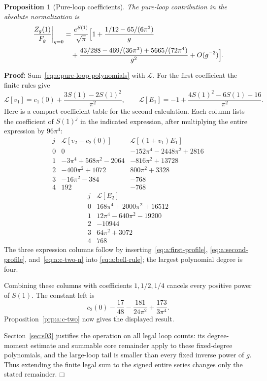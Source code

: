 \documentclass[a4paper,10pt]{article}
\numberwithin{equation}{section}
\theoremstyle{paperplain}
\newtheorem{prp}[thm]{Proposition}
\theoremstyle{paperremark}
\theoremstyle{paperplain}
\newenvironment{prf}{\noindent \textbf{Proof: }}{\hfill $\mdlgwhtsquare$\par\addvspace{0.5\baselineskip}}
\begin{document}
\begin{prp}[Pure-loop coefficients]\label{prp:a:pure-loops}
The pure-loop contribution in the absolute normalization is
\begin{equation}\label{eq:a:q-zero}
\begin{aligned}
 \left.\frac{Z_g(1)}{F_g}\right|_{q=0}
 &=\frac{e^{S(1)}}{\sqrt\pi}\Bigl[1
   +\frac{1/12-65/(6\pi^2)}g\\
 &\quad+\frac{43/288-469/(36\pi^2)+5665/(72\pi^4)}{g^2}
   +O(g^{-3})\Bigr].
\end{aligned}
\end{equation}
\end{prp}
\begin{prf}
Sum~\eqref{eq:a:pure-loop-polynomials} with $\mathcal L$.
For the first coefficient the finite rules give
\[
 \mathcal L[v_1]=c_1(0)+\frac{3S(1)-2S(1)^2}{\pi^2},\qquad
 \mathcal L[E_1]=-1+\frac{4S(1)^2-6S(1)-16}{\pi^2}.
\]
Here is a compact coefficient table for the second calculation. Each
column lists the coefficient of $S(1)^j$ in the indicated expression,
after multiplying the entire expression by $96\pi^4$:
\[
\begin{array}{c|r|r}
 j&\mathcal L[v_2-c_2(0)]&\mathcal L[(1+v_1)E_1]\\\hline
0&0&-152\pi^4-2448\pi^2+2816\\
1&-3\pi^4+568\pi^2-2064&-816\pi^2+13728\\
2&-400\pi^2+1072&800\pi^2+3328\\
3&-16\pi^2-384&-768\\
4&192&-768
\end{array}
\]
\[
\begin{array}{c|r}
 j&\mathcal L[E_2]\\\hline
0&168\pi^4+2000\pi^2+16512\\
1&12\pi^4-640\pi^2-19200\\
2&-10944\\
3&64\pi^2+3072\\
4&768
\end{array}
\]
The three expression columns follow by inserting~\eqref{eq:a:first-profile},
\eqref{eq:a:second-profile}, and~\eqref{eq:a:c-two-n} into
\eqref{eq:a:bell-rule}; the largest polynomial degree is four.

Combining these columns with coefficients $1,1/2,1/4$ cancels every
positive power of $S(1)$. The constant left is
\[
 c_2(0)-\frac{17}{48}-\frac{181}{24\pi^2}
                                      +\frac{173}{3\pi^4}.
\]
Proposition~\ref{prp:a:c-two} now gives the displayed result.

Section~\ref{sec:s03} justifies the operation on all legal loop
counts: its degree-moment estimate and summable core remainder apply
to these fixed-degree polynomials, and the large-loop tail is smaller
than every fixed inverse power of $g$. Thus extending the finite legal
sum to the signed entire series changes only the stated remainder.
\end{prf}
\end{document}
